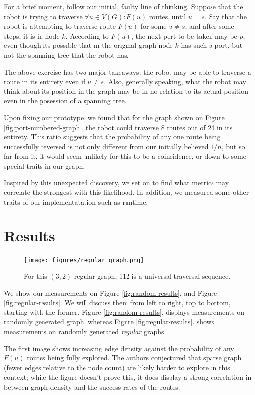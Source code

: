 \documentclass{article}
\begin{document}
For a brief moment, follow our initial, faulty line of thinking. Suppose that the robot is trying to traverse $\forall u\in V(G): F(u)$ routes, until $u = s$. Say that the robot is attempting to traverse route $F(u)$ for some $u \neq s$, and after some steps, it is in node $k$. According to $F(u)$, the next port to be taken may be $p$, even though its possible that in the original graph node $k$ has such a port, but not the spanning tree that the robot has.

The above exercise has two major takeaways: the robot may be able to traverse a route in its entirety even if $u \neq s$. Also, generally speaking, what the robot may think about its position in the graph may be in no relation to its actual position even in the posession of a spanning tree.

Upon fixing our prototype, we found that for the graph shown on Figure \ref{fig:port-numbered-graph}, the robot could traverse 8 routes out of 24 in its entirety. This ratio suggests that the probability of any one route being successfully reversed is not only different from our initially believed $1/n$, but so far from it, it would seem unlikely for this to be a coincidence, or down to some special traits in our graph.

Inspired by this unexpected discovery, we set on to find what metrics may correlate the strongest with this likelihood. In addition, we measured some other traits of our implementatation such as runtime.

\section{Results}
\label{sec:results}

\begin{figure}
  \centering
  \texttt{[image: figures/regular\_graph.png]}
  \caption{For this $(3,2)$-regular graph, 112 is a universal traversal sequence.}
  \label{fig:regular-graph}
\end{figure}

We show our measurements on Figure \ref{fig:random-results}. and Figure \ref{fig:regular-results}. We will discuss them from left to right, top to bottom, starting with the former. Figure \ref{fig:random-results}. displays measurements on randomly generated graph, whereas Figure \ref{fig:regular-results}. shows measurements on randomly generated \textit{regular} graphs.

The first image shows increasing edge density against the probability of any $F(u)$ routes being fully explored. The authors conjectured that sparse graph (fewer edges relative to the node count) are likely harder to explore in this context; while the figure doesn't prove this, it does display a strong correlation in between graph density and the success rates of the routes.
\end{document}
